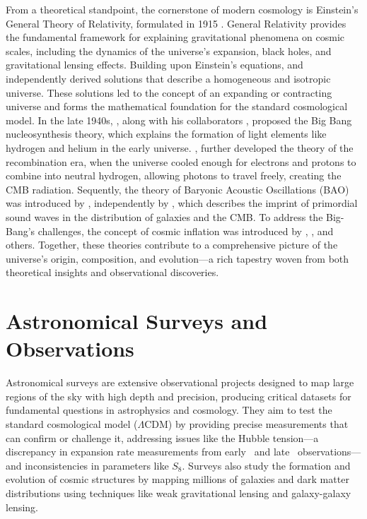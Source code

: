 From a theoretical standpoint, the cornerstone of modern cosmology is 
Einstein's General Theory of Relativity, formulated in 1915 \citep{1915SPAW.......844E}. General Relativity provides the fundamental framework for explaining gravitational phenomena on cosmic scales, including the dynamics of the universe's expansion, black holes, and gravitational lensing effects. Building upon Einstein's equations, \citet{1922ZPhy...10..377F} and \citet{1931MNRAS..91..483L} independently derived solutions that describe a homogeneous and isotropic universe. These solutions led to the concept of an expanding or contracting universe and forms the mathematical foundation for the standard cosmological model. In the late 1940s, \citet{1948Natur.162..680G}, along with his collaborators \citet{1948Natur.162..774A}, proposed the Big Bang nucleosynthesis theory, which explains the formation of light elements like hydrogen and helium in the early universe. 
\citet{1968ApJ...153....1P}, \citet{1969Ap&SS...4..301Z} further developed the theory of the recombination era, when the universe cooled enough for electrons and protons to combine into neutral hydrogen, allowing photons to travel freely, creating the CMB radiation. Sequently, the theory of Baryonic Acoustic Oscillations (BAO) was introduced by \citet{1970Ap&SS...7....3S}, independently by \citet{1970ApJ...162..815P}, which describes the imprint of primordial sound waves in the distribution of galaxies and the CMB. To address the Big-Bang's challenges, the concept of cosmic inflation was introduced by \citet{1981PhRvD..23..347G}, \citet{1982PhLB..108..389L}, and others. Together, these theories contribute to a comprehensive picture of the universe's origin, composition, and evolution—a rich tapestry woven from both theoretical insights and observational discoveries.

\section{Astronomical Surveys and Observations}
Astronomical surveys are extensive observational projects designed to map large regions of the sky with high depth and precision, producing critical datasets for fundamental questions in astrophysics and cosmology. They aim to test the standard cosmological model ($\Lambda$CDM) by providing precise measurements that can confirm or challenge it, addressing issues like the Hubble tension—a discrepancy in expansion rate measurements from early~\citep{2016A&A...594A..13P} and late~\citep{2019ApJ...876...85R} observations—and inconsistencies in parameters like $S_8$. Surveys also study the formation and evolution of cosmic structures by mapping millions of galaxies and dark matter distributions using techniques like weak gravitational lensing and galaxy-galaxy lensing\citep{2013MNRAS.432.1544M, 2022PhRvD.105b3520A}.

